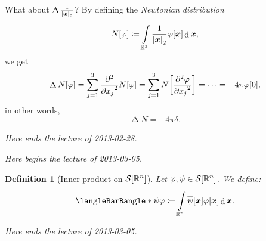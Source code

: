 \documentclass[10pt]{article}
\newtheorem*{definition}{Definition}
\DeclarePairedDelimiter\singleBars{\lvert}{\rvert}
\DeclarePairedDelimiter\parentheses{\lparen}{\rparen}
\DeclarePairedDelimiter\squareBrackets{[}{]}
\newcommand{\Dirac}[1][]{\delta_{#1}}
\DeclareMathOperator{\Laplacian}{\Delta}
\DeclareMathOperator{\diffd}{d}
\newcommand{\conj}[1]{\overline{#1}}
\newcommand\pderiv[3][]{\frac{\partial^{#1} #3}{{\partial {#2}}^{#1}}}
\newcommand{\pderivop}[2][]{\pderiv[#1]{#2}{}}
\newcommand{\R}{\mathbb{R}}
\newcommand{\SchwartzSpace}{\mathcal{S}}
\newcommand\of[1]{\parentheses*{#1}}
\newcommand\norm[1]{\singleBars*{#1}}
\newcommand{\SchwartzInner}[2]{\langleBarRangle*{#1}{#2}}
\newcommand\gj\varphi
\newcommand\gy\psi
\newcommand{\vx}{{\vectorsym x}}
\renewcommand\of[1]{\squareBrackets*{#1}}
\renewcommand\norm[1]{\singleBars*{#1}_{2}}
\newcommand{\Rn}{{\R^n}}
\newcommand{\Schwartz}{{\SchwartzSpace\of{\Rn}}}
\newcommand{\lectureStart}[1]{

\noindent \emph{Here begins the lecture of #1.}

}
\newcommand{\lectureEnd}[1]{

\emph{Here ends the lecture of #1.}

}
\begin{document}
  What about $\Laplacian\frac{1}{\norm{\vx}}$? By defining the \emph{Newtonian distribution}
  \begin{equation*}
    N\of\gj \coloneqq \int{\R^3} \frac{1}{\norm{\vx}} \gj\of\vx \diffd{\vx},
  \end{equation*}
  we get
  \begin{equation*}
    \Laplacian{N}\of\gj = \sum{j = 1}[3] \pderivop[2]{x_j}N\of\gj = \sum{j = 1}[3]  N\of{\pderiv[2]{x_j}\gj} = \dotsb = -4 \pi \gj\of{0},
  \end{equation*}
  in other words,
  \begin{equation*}
    \Laplacian N = -4 \pi \Dirac.
  \end{equation*}
  \lectureEnd{2013-02-28}
  \lectureStart{2013-03-05}
  \begin{definition}[Inner product on $\Schwartz$]
  Let $\gj,\gy\in\Schwartz$. We define:
  \begin{equation*}
  \SchwartzInner \gy \gj \coloneqq \int\Rn \conj\gy\of\vx \gj\of\vx \diffd\vx .
  \end{equation*}
  \end{definition}
  \lectureEnd{2013-03-05}
\end{document}
